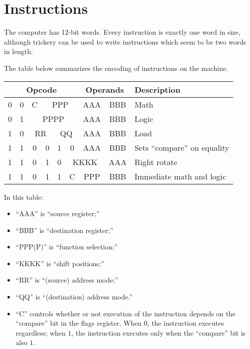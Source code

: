 \documentclass[10pt]{article}
\begin{document}
\maketitle

\section{Instructions}

The computer has 12-bit words.  Every instruction is exactly one word in size, although trickery can be used to write instructions which seem to be two words in length.

The table below summarizes the encoding of instructions on the machine.

\begin{tabular}{|c|c|c|c|c|c||c|c|c|c|c|c||l|}
\hline
\multicolumn{6}{|c||}{Opcode} & \multicolumn{6}{c||}{Operands} & Description \\
\hline
\hline
0 & 0 & C & \multicolumn{3}{c||}{PPP} & \multicolumn{3}{c|}{AAA} & \multicolumn{3}{c||}{BBB} & Math\\
\hline
0 & 1 & \multicolumn{4}{c||}{PPPP} & \multicolumn{3}{c|}{AAA} & \multicolumn{3}{c||}{BBB} & Logic \\
\hline
1 & 0 & \multicolumn{2}{c|}{RR} & \multicolumn{2}{c||}{QQ} & \multicolumn{3}{c|}{AAA} & \multicolumn{3}{c||}{BBB} & Load \\
\hline
1 & 1 & 0 & 0 & 1 & 0 & \multicolumn{3}{c|}{AAA} & \multicolumn{3}{c||}{BBB} & Sets ``compare'' on equality \\
\hline
1 & 1 & 0 & 1 & 0 & \multicolumn{4}{c|}{KKKK} & \multicolumn{3}{c||}{AAA} & Right rotate \\
\hline
1 & 1 & 0 & 1 & 1 & C & \multicolumn{3}{c|}{PPP} & \multicolumn{3}{c||}{BBB} & Immediate math and logic \\
\hline
\end{tabular}

In this table:
\begin{itemize}
\item ``AAA'' is ``source register;''
\item ``BBB'' is ``destination register;''
\item ``PPP(P)'' is ``function selection;''
\item ``KKKK'' is ``shift positions;''
\item ``RR'' is ``(source) address mode;''
\item ``QQ'' is ``(destination) address mode.''
\item ``C'' controls whether or not execution of the instruction depends on the ``compare'' bit in the flags register.  When $0$, the instruction executes regardless; when $1$, the instruction executes only when the ``compare'' bit is also $1$.
\end{itemize}
\end{document}

